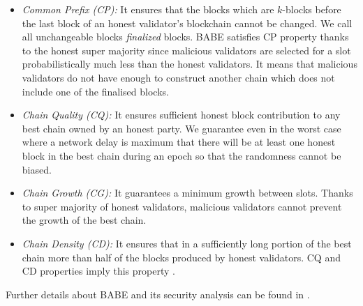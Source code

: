 \begin{itemize}
	\item \emph{Common Prefix (CP):} \label{item:common_prefix}
	 It ensures that the blocks which are $ k $-blocks before the last block of an honest validator's blockchain cannot be changed. We call  all unchangeable blocks  \emph{finalized} blocks. BABE satisfies CP property thanks to the honest super majority since malicious validators are selected for a slot probabilistically much less than the honest validators. It means that malicious validators do
	  not have enough 
	  to construct another chain which does not include one of the finalised blocks.
	\item \emph{Chain Quality (CQ):} \label{item:chain_quality} It ensures sufficient honest block contribution to any best chain owned by an honest party. We guarantee even in the worst case where a network delay is maximum that there will be at least one honest block in the best chain during an epoch so that the randomness cannot be biased.
	\item \emph{Chain Growth (CG):} \label{item:chain_growth} It guarantees a minimum growth between slots. Thanks to super majority of honest validators, malicious validators cannot prevent the growth of the best chain.
	
	\item \emph{Chain Density (CD):} \label{item:chain_density} It ensures that in a sufficiently long portion of the best chain more than half of the blocks produced by honest validators. CQ and CD properties %
	imply this property \cite{Praos}.
\end{itemize}
Further details about BABE and  its security analysis can be found in \cite{babe}.

